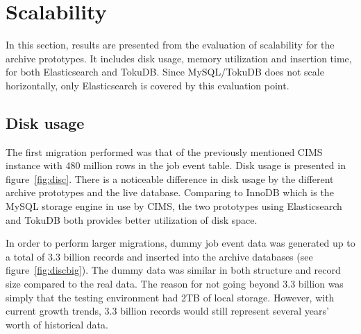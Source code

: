 

\section{Scalability}
In this section, results are presented from the evaluation of scalability for the archive prototypes. It includes disk usage, memory utilization and insertion time, for both Elasticsearch and TokuDB. Since MySQL/TokuDB does not scale horizontally, only Elasticsearch is covered by this evaluation point.

\subsection{Disk usage}
The first migration performed was that of the previously mentioned CIMS instance with 480 million rows in the job event table. Disk usage is presented in figure~\ref{fig:disc}. There is a noticeable difference in disk usage by the different archive prototypes and the live database. Comparing to InnoDB which is the MySQL storage engine in use by CIMS, the two prototypes using Elasticsearch and TokuDB both provides better utilization of disk space.

In order to perform larger migrations, dummy job event data was generated up to a total of 3.3 billion records and inserted into the archive databases (see figure~\ref{fig:discbig}). The dummy data was similar in both structure and record size compared to the real data. The reason for not going beyond 3.3 billion was simply that the testing environment had 2TB of local storage. However, with current growth trends, 3.3 billion records would still represent several years' worth of historical data.

